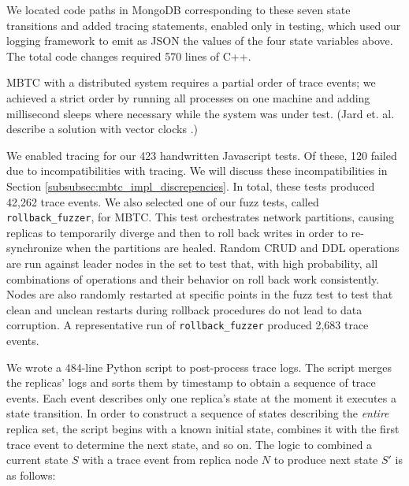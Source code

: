\documentclass{vldb}
\begin{document}
We located code paths in MongoDB corresponding to these seven state transitions and added tracing statements, enabled only in testing, which used our logging framework to emit as JSON the values of the four state variables above. 
The total code changes required 570 lines of C++.

MBTC with a distributed system requires a partial order of trace events; we achieved a strict order by running all processes on one machine and adding millisecond sleeps where necessary while the system was under test. 
(Jard et. al. describe a solution with vector clocks \cite{Jard94GeneralApproachToTraceChecking}.)


We enabled tracing for our 423 handwritten Javascript tests. 
Of these, 120 failed due to incompatibilities with tracing. 
We will discuss these incompatibilities in Section \ref{subsubsec:mbtc_impl_discrepencies}.
In total, these tests produced 42,262 trace events. 
We also selected one of our fuzz tests, called \texttt{rollback\_fuzzer}, for MBTC. 
This test orchestrates network partitions, causing replicas to temporarily diverge and then to roll back writes in order to re-synchronize when the partitions are healed.
Random CRUD and DDL operations are run against leader nodes in the set to test that, with high probability, all combinations of operations and their behavior on roll back work consistently.
Nodes are also randomly restarted at specific points in the fuzz test to test that clean and unclean restarts during rollback procedures do not lead to data corruption.
A representative run of \texttt{rollback\_fuzzer} produced 2,683 trace events.

We wrote a 484-line Python script \cite{ReplTraceChecker} to post-process trace logs. 
The script merges the replicas' logs and sorts them by timestamp to obtain a sequence of trace events. 
Each event describes only one replica's state at the moment it executes a state transition.
In order to construct a sequence of states describing the \textit{entire} replica set, 
the script begins with a known initial state, combines it with the first trace event to determine the next state, and so on. 
The logic to combined a current state \ensuremath{S} with a trace event from replica node \ensuremath{N} to produce next state \ensuremath{S'} is as follows:
\end{document}

